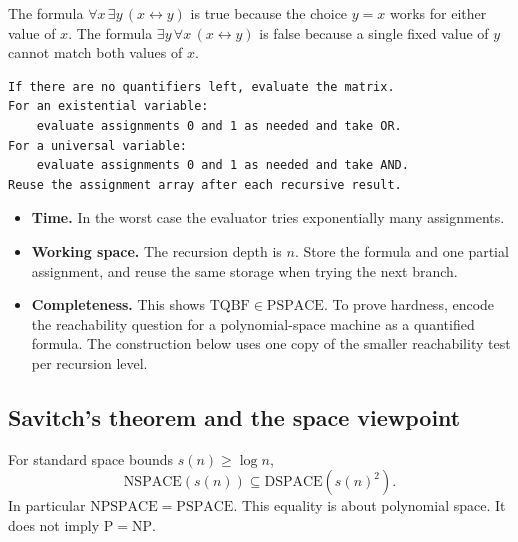 \documentclass[12pt,a4paper]{article}
\begin{document}
\begin{tcolorbox}[examplebox, title={Quantifier order matters}]
The formula $\forall x\,\exists y\,(x\leftrightarrow y)$ is true because the choice $y=x$ works for either value of $x$. The formula $\exists y\,\forall x\,(x\leftrightarrow y)$ is false because a single fixed value of $y$ cannot match both values of $x$.
\end{tcolorbox}

\begin{tcolorbox}[formulabox, title={Depth-first evaluation of a quantified Boolean formula}]
\begin{verbatim}
If there are no quantifiers left, evaluate the matrix.
For an existential variable:
    evaluate assignments 0 and 1 as needed and take OR.
For a universal variable:
    evaluate assignments 0 and 1 as needed and take AND.
Reuse the assignment array after each recursive result.
\end{verbatim}
\end{tcolorbox}

\begin{itemize}[leftmargin=*, itemsep=2pt]
  \item \textbf{Time.} In the worst case the evaluator tries exponentially many assignments.
  \item \textbf{Working space.} The recursion depth is $n$. Store the formula and one partial assignment, and reuse the same storage when trying the next branch.
  \item \textbf{Completeness.} This shows $\mathrm{TQBF}\in\mathrm{PSPACE}$. To prove hardness, encode the reachability question for a polynomial-space machine as a quantified formula. The construction below uses one copy of the smaller reachability test per recursion level.
\end{itemize}

\subsection{Savitch's theorem and the space viewpoint}
\begin{tcolorbox}[formulabox, title={Savitch's theorem}]
For standard space bounds $s(n)\ge\log n$,
\[
\mathrm{NSPACE}(s(n))\subseteq\mathrm{DSPACE}(s(n)^2).
\]
In particular $\mathrm{NPSPACE}=\mathrm{PSPACE}$. This equality is about polynomial space. It does not imply $\mathrm{P}=\mathrm{NP}$.
\end{tcolorbox}
\end{document}

